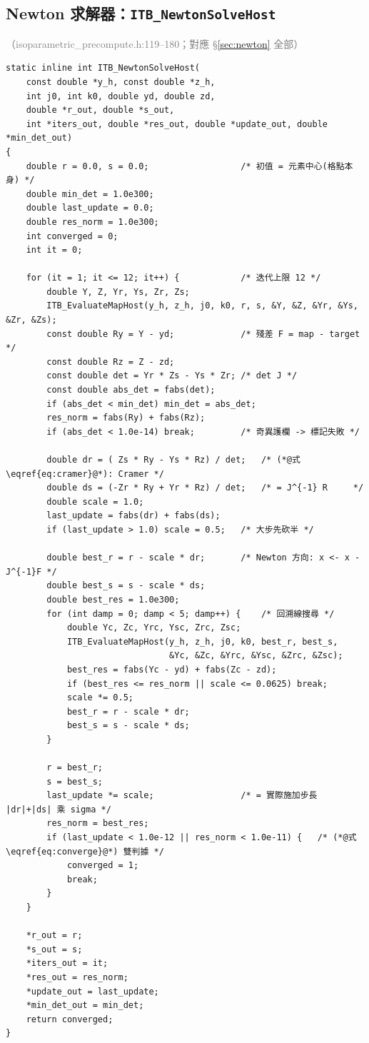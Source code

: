 \documentclass[11pt,a4paper]{article}
\newcommand{\code}[1]{\texttt{#1}}
\newcommand{\filewhere}[1]{\textcolor{gray}{\small（#1）}}
\begin{document}
\subsection{Newton 求解器：\code{ITB\_NewtonSolveHost}}
\filewhere{isoparametric\_precompute.h:119--180；對應 \S\ref{sec:newton} 全部}
\begin{lstlisting}[caption={阻尼 Newton--Raphson 反映射求解器（完整原文）}]
static inline int ITB_NewtonSolveHost(
    const double *y_h, const double *z_h,
    int j0, int k0, double yd, double zd,
    double *r_out, double *s_out,
    int *iters_out, double *res_out, double *update_out, double *min_det_out)
{
    double r = 0.0, s = 0.0;                  /* 初值 = 元素中心(格點本身) */
    double min_det = 1.0e300;
    double last_update = 0.0;
    double res_norm = 1.0e300;
    int converged = 0;
    int it = 0;

    for (it = 1; it <= 12; it++) {            /* 迭代上限 12 */
        double Y, Z, Yr, Ys, Zr, Zs;
        ITB_EvaluateMapHost(y_h, z_h, j0, k0, r, s, &Y, &Z, &Yr, &Ys, &Zr, &Zs);
        const double Ry = Y - yd;             /* 殘差 F = map - target */
        const double Rz = Z - zd;
        const double det = Yr * Zs - Ys * Zr; /* det J */
        const double abs_det = fabs(det);
        if (abs_det < min_det) min_det = abs_det;
        res_norm = fabs(Ry) + fabs(Rz);
        if (abs_det < 1.0e-14) break;         /* 奇異護欄 -> 標記失敗 */

        double dr = ( Zs * Ry - Ys * Rz) / det;   /* (*@式\eqref{eq:cramer}@*): Cramer */
        double ds = (-Zr * Ry + Yr * Rz) / det;   /* = J^{-1} R     */
        double scale = 1.0;
        last_update = fabs(dr) + fabs(ds);
        if (last_update > 1.0) scale = 0.5;   /* 大步先砍半 */

        double best_r = r - scale * dr;       /* Newton 方向: x <- x - J^{-1}F */
        double best_s = s - scale * ds;
        double best_res = 1.0e300;
        for (int damp = 0; damp < 5; damp++) {    /* 回溯線搜尋 */
            double Yc, Zc, Yrc, Ysc, Zrc, Zsc;
            ITB_EvaluateMapHost(y_h, z_h, j0, k0, best_r, best_s,
                                &Yc, &Zc, &Yrc, &Ysc, &Zrc, &Zsc);
            best_res = fabs(Yc - yd) + fabs(Zc - zd);
            if (best_res <= res_norm || scale <= 0.0625) break;
            scale *= 0.5;
            best_r = r - scale * dr;
            best_s = s - scale * ds;
        }

        r = best_r;
        s = best_s;
        last_update *= scale;                 /* = 實際施加步長 |dr|+|ds| 乘 sigma */
        res_norm = best_res;
        if (last_update < 1.0e-12 || res_norm < 1.0e-11) {   /* (*@式\eqref{eq:converge}@*) 雙判據 */
            converged = 1;
            break;
        }
    }

    *r_out = r;
    *s_out = s;
    *iters_out = it;
    *res_out = res_norm;
    *update_out = last_update;
    *min_det_out = min_det;
    return converged;
}
\end{lstlisting}
\end{document}
